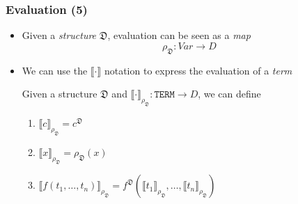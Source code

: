 \documentclass{beamer}
\begin{document}
                \begin{frame}
                    \frametitle{Evaluation (5)}
                    \begin{itemize}
                        \item Given a \textit{structure} $ \mathfrak{D} $, evaluation can be seen as a \textit{map}
                        \[
                            \rho_\mathfrak{D}: Var \to D
                        \]
                        \item We can use the $ \llbracket \cdot \rrbracket $ notation to express the evaluation of a \textit{term}
                        \begin{definition}
                            Given a structure $ \mathfrak{D} $ and $ \llbracket \cdot \rrbracket_{\rho_\mathfrak{D}}: \texttt{TERM} \to D $, we can define
                            \begin{enumerate}
                                \item $ \llbracket c \rrbracket_{\rho_\mathfrak{D}} = c^\mathfrak{D}$
                                \item $ \llbracket x \rrbracket_{\rho_\mathfrak{D}} = \rho_\mathfrak{D}(x) $
                                \item $ \llbracket f(t_1, \dots, t_n) \rrbracket_{\rho_\mathfrak{D}} = f^\mathfrak{D}(\llbracket t_1 \rrbracket_{\rho_\mathfrak{D}}, \dots, \llbracket t_n \rrbracket_{\rho_\mathfrak{D}}) $
                            \end{enumerate}
                        \end{definition}
                    \end{itemize}
                \end{frame}
\end{document}
